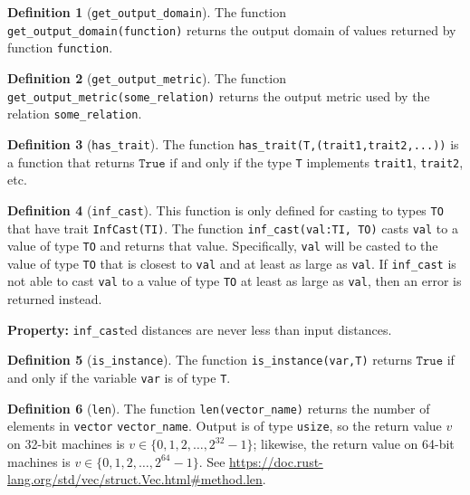 \documentclass[11pt,a4paper]{article}
\theoremstyle{definition}
\newtheorem{definition}{Definition}[section]
\newcommand{\True}{\texttt{True}}
\newcommand{\inRust}[2]{See \url{#2}.}
\newcommand{\iffText}{\text{if and only if}}
\begin{document}
\begin{definition}[\texttt{get\_output\_domain}]
    The function \texttt{get\_output\_domain(function)} returns the output domain of values returned by function \texttt{function}.
\end{definition}

\begin{definition}[\texttt{get\_output\_metric}]
    The function \texttt{get\_output\_metric(some\_relation)} returns the output metric used by the relation \texttt{some\_relation}.
\end{definition}

\begin{definition}[\texttt{has\_trait}]
    The function \texttt{has\_trait(T,(trait1,trait2,...))} is a function that returns $\True$ $\iffText$ the type \texttt{T} implements \texttt{trait1}, \texttt{trait2}, etc.
\end{definition}

\begin{definition}[\texttt{inf\_cast}]
    This function is only defined for casting to types \texttt{TO} that have trait \texttt{InfCast(TI)}. The function \texttt{inf\_cast(val:TI, TO)} casts \texttt{val} to a value of type \texttt{TO} and returns that value. Specifically, \texttt{val} will be casted to the value of type \texttt{TO} that is closest to \texttt{val} and at least as large as \texttt{val}. If \texttt{inf\_cast} is not able to cast \texttt{val} to a value of type \texttt{TO} at least as large as \texttt{val}, then an error is returned instead.
    
    \textbf{Property:} \texttt{inf\_cast}ed distances are never less than input distances.
\end{definition}

\begin{definition}[\texttt{is\_instance}]
    The function \texttt{is\_instance(var,T)} returns $\True$ if and only if the variable \texttt{var} is of type \texttt{T}.
\end{definition}

\begin{definition}[\texttt{len}]
    The function \texttt{len(vector\_name)} returns the number of elements in \texttt{vector} \texttt{vector\_name}. Output is of type \texttt{usize}, so the return value $v$ on 32-bit machines is $v\in \{0,1,2,\ldots,2^{32} - 1\}$; likewise, the return value on 64-bit machines is $v\in \{0,1,2,\ldots,2^{64} - 1\}$. \inRust{std::vec::Vec::len}{https://doc.rust-lang.org/std/vec/struct.Vec.html\#method.len}
\end{definition}
\end{document}
